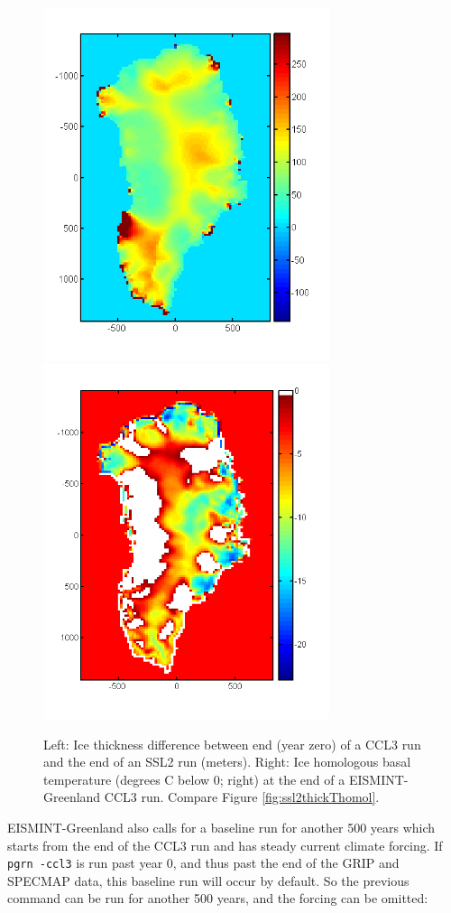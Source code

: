 \documentclass[11pt,final]{amsart}
\begin{document}
\begin{figure}[ht]
\includegraphics[width=3.3in]{figs/Hdiff_CCLSSL}\,\includegraphics[width=3.3in]{figs/Thomol_CCL}
\caption{Left:  Ice thickness difference between end (year zero) of a CCL3 run and the end of an SSL2 run (meters).  Right:  Ice homologous basal temperature (degrees C below 0; right) at the end of a EISMINT-Greenland CCL3 run.  Compare Figure \ref{fig:ssl2thickThomol}.}
\label{fig:cclthickThomol}
\end{figure}

EISMINT-Greenland also calls for a baseline run for another 500 years which starts from the end of the CCL3 run and has steady current climate forcing.  If \verb|pgrn -ccl3| is run past year 0, and thus past the end of the GRIP and SPECMAP data, this baseline run will occur by default.  So the previous command can be run for another 500 years, and the forcing can be omitted:
\end{document}
